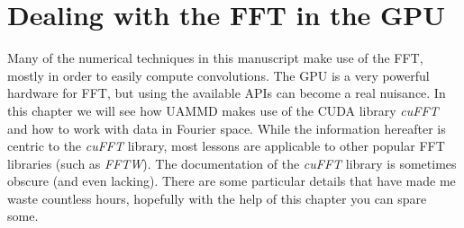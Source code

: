 \documentclass[ twoside,openright,titlepage,numbers=noenddot,%
headinclude,footinclude,cleardoublepage=empty,abstract=on,
BCOR=5mm,paper=a4,fontsize=11pt, dvipsnames
]{scrreprt}
\def\ucpp{uammd_cpp_lexer.py:UAMMDCppLexer -x}
\newcommand{\uammd}{\gls{UAMMD}\xspace}
\newcommand{\gpu}{\gls{GPU}\xspace}
\begin{document}
%    



\chapter{Dealing with the FFT in the GPU} \label{ch:appendixa}

Many of the numerical techniques in this manuscript make use of the \gls{FFT}, mostly in order to easily compute convolutions. The \gpu is a very powerful hardware for \gls{FFT}, but using the available \glspl{API} can become a real nuisance. In this chapter we will see how \uammd makes use of the CUDA library \emph{cuFFT}\cite{cufft} and how to work with data in Fourier space. While the information hereafter is centric to the \emph{cuFFT} library, most lessons are applicable to other popular \gls{FFT} libraries (such as \emph{FFTW}).
The documentation of the \emph{cuFFT} library is sometimes obscure (and even lacking). There are some particular details that have made me waste countless hours, hopefully with the help of this chapter you can spare some.
\end{document}
